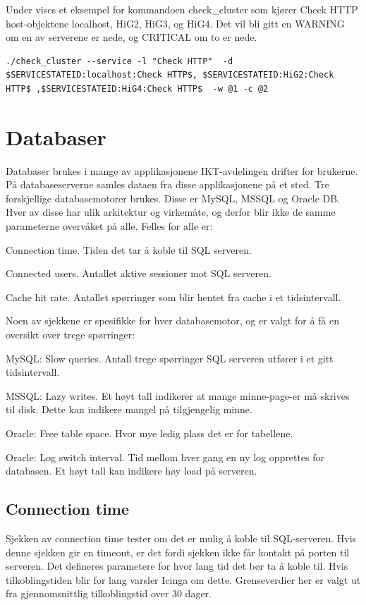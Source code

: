 Under vises et eksempel for kommandoen check\_cluster som kjører Check HTTP host-objektene localhost, HiG2, HiG3, og HiG4. Det vil bli gitt en WARNING om en av serverene er nede, og CRITICAL om to er nede. 
\begin{lstlisting}[style=example]
./check_cluster --service -l "Check HTTP"  -d $SERVICESTATEID:localhost:Check HTTP$, $SERVICESTATEID:HiG2:Check HTTP$ ,$SERVICESTATEID:HiG4:Check HTTP$  -w @1 -c @2
\end{lstlisting}

\section{Databaser}
Databaser brukes i mange av applikasjonene IKT-avdelingen drifter for brukerne. På databaseserverne samles dataen fra disse applikasjonene på et sted. 
Tre forskjellige databasemotorer brukes. Disse er MySQL, MSSQL og Oracle DB. Hver av disse har ulik arkitektur og virkemåte\cite{databasecomparison}, og derfor blir ikke de samme parameterne overvåket på alle. Felles for alle er:
\begin{itemize*}
	\item Connection time. Tiden det tar å koble til SQL serveren.
	\item Connected users. Antallet aktive sessioner mot SQL serveren.
	\item Cache hit rate. Antallet spørringer som blir hentet fra cache i et tidsintervall.
\end{itemize*}

Noen av sjekkene er spesifikke for hver databasemotor, og er valgt for å få en oversikt over trege spørringer:
\begin{itemize*}
\item MySQL: Slow queries. Antall trege spørringer SQL serveren utfører i et gitt tidsintervall.
\item MSSQL: Lazy writes. Et høyt tall indikerer at mange minne-page-er må skrives til disk. Dette kan indikere mangel på tilgjengelig minne.
\item Oracle: Free table space. Hvor mye ledig plass det er for tabellene.
\item Oracle: Log switch interval. Tid mellom hver gang en ny log opprettes for databasen. Et høyt tall kan indikere høy load på serveren.
\end{itemize*}

\subsection*{Connection time}
Sjekken av connection time tester om det er mulig å koble til SQL-serveren. Hvis denne sjekken gir en timeout, er det fordi sjekken ikke får kontakt på porten til serveren. Det defineres parametere for hvor lang tid det bør ta å koble til. Hvis tilkoblingstiden blir for lang varsler Icinga om dette. Grenseverdier her er valgt ut fra gjennomsnittlig tilkoblingstid over 30 dager.

